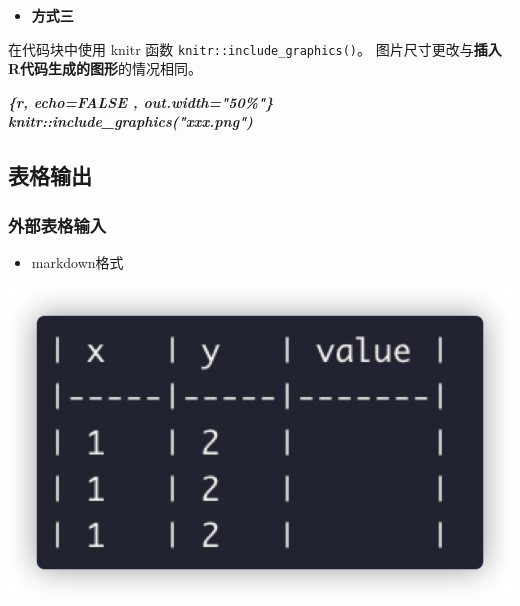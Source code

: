 \documentclass[
]{book}
\newenvironment{Shaded}{\begin{snugshade}}{\end{snugshade}}
\newcommand{\InformationTok}[1]{\textcolor[rgb]{0.56,0.35,0.01}{\textbf{\textit{#1}}}}
\providecommand{\tightlist}{%
  \setlength{\itemsep}{0pt}\setlength{\parskip}{0pt}}
\begin{document}
\begin{itemize}
\tightlist
\item
  \textbf{方式三}
\end{itemize}

在代码块中使用 knitr 函数 \texttt{knitr::include\_graphics()}。
图片尺寸更改与\textbf{插入R代码生成的图形}的情况相同。

\begin{Shaded}
\begin{Highlighting}[]
\InformationTok{\textasciigrave{}\textasciigrave{}\textasciigrave{}\{r, echo=FALSE , out.width="50\%"\} }
\InformationTok{knitr::include\_graphics("xxx.png")}
\InformationTok{\textasciigrave{}\textasciigrave{}\textasciigrave{}}
\end{Highlighting}
\end{Shaded}

\hypertarget{ux8868ux683cux8f93ux51fa}{%
\subsection{表格输出}\label{ux8868ux683cux8f93ux51fa}}

\hypertarget{ux5916ux90e8ux8868ux683cux8f93ux5165}{%
\subsubsection{外部表格输入}\label{ux5916ux90e8ux8868ux683cux8f93ux5165}}

\begin{itemize}
\tightlist
\item
  markdown格式
\end{itemize}

\includegraphics{images/paste-4AB4302F.png}
\end{document}
